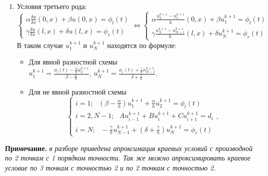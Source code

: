 \documentclass[12pt]{article}
\begin{document}
\begin{enumerate}
        \item Условия третьего рода:
            \begin{equation*}
                \begin{cases}
                    \alpha\frac{\delta u}{\delta x}(0,x) + \beta u(0,x)= \phi_l(t)
                    \\
                    \gamma\frac{\delta u}{\delta x}(l,x) + \delta u(l,x)= \phi_r(t)
                \end{cases}
                \Leftrightarrow
                \begin{cases}
                    \alpha\frac{u_{2}^{k+1}-u_{1}^{k+1}}{h}(0,x) + \beta u_{1}^{k+1} = \phi_l(t)
                    \\
                    \gamma\frac{u_{N}^{k+1}-u_{N-1}^{k+1}}{h}(l,x) + \delta u_{N}^{k+1}= \phi_r(t)
                \end{cases}
            \end{equation*}
            В таком случае $u_1^{k+1}$ и $u_N^{k+1}$ находятся по формуле:
            \begin{itemize}
                \item Для явной разностной схемы\\
                $u_1^{k+1}=\frac{\phi_l(t)-\frac{\alpha}{h}u_2^{k+1}}{\beta-\frac{\alpha}{h}}$, 
                $u_N^{k+1}=\frac{\phi_r(t)+\frac{\gamma}{h}n_{N-1}^{k+1}}{\delta+\frac{\gamma}{h}}$.
                \item Для не явной разностной схемы\\
                \begin{equation*}
                    \begin{cases}
                        i=1;\:\:\: \left(\beta-\frac{\alpha}{h}\right)u_1^{k+1} +\frac{\alpha}{h}u_{2}^{k+1}=\phi_l(t)
                        \\
                        i=\overline{2,N-1};\:\:\:Au_{i-1}^{k+1} + Bu_i^{k+1} +Cu_{i+1}^{k+1}=d_i
                        \\
                        i=N;\:\:\: -\frac{\gamma}{h}u_{N-1}^{k+1} + \left(\delta+\frac{\gamma}{h}\right)u_N^{k+1} =\phi_r(t)
                    \end{cases},
                \end{equation*}
            \end{itemize}
    \end{enumerate}
    \textbf{Примечание.}
    \emph{в разборе приведена апроксимация краевых условий с производной по 2 точкам с 1 порядком точности. Так же можно апроксимировать краевое 
    условие по 3 точкам с точностью 2 и по 2 точкам с точностью 2.}
\end{document}
